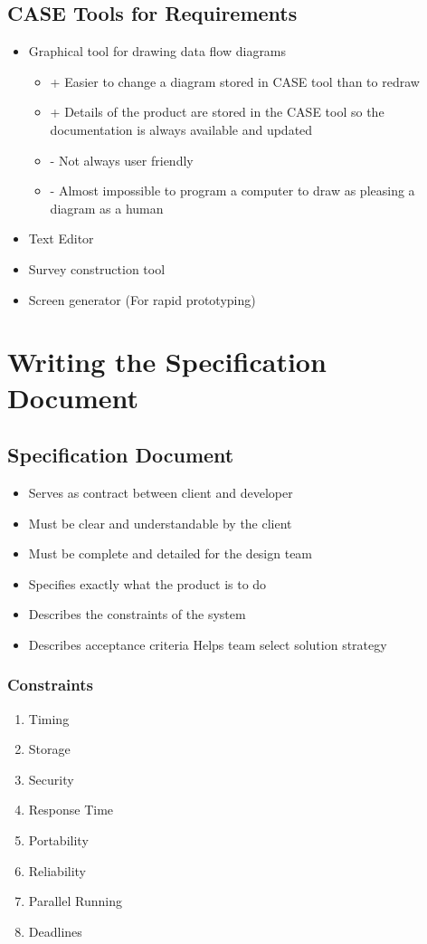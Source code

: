 \documentclass{report}
\begin{document}
		\section{CASE Tools for Requirements}
			\begin{itemize}
				\item Graphical tool for drawing data flow diagrams
					\begin{itemize}
						\item + Easier to change a diagram stored in CASE tool than to redraw
						\item + Details of the product are stored in the CASE tool so the documentation is always available and updated
						\item - Not always user friendly
						\item - Almost impossible to program a computer to draw as pleasing a diagram as a human
					\end{itemize}
				\item Text Editor
				\item Survey construction tool
				\item Screen generator (For rapid prototyping)
			\end{itemize}
	\chapter{Writing the Specification Document} %
		\section{Specification Document}
			\begin{itemize}
				\item Serves as contract between client and developer
				\item Must be clear and understandable by the client
				\item Must be complete and detailed for the design team
				\item Specifies exactly what the product is to do
				\item Describes the constraints of the system
				\item Describes acceptance criteria	Helps team select solution strategy
			\end{itemize}
			\subsection{Constraints} %
				\begin{enumerate}
					\item Timing
					\item Storage
					\item Security
					\item Response Time
					\item Portability
					\item Reliability
					\item Parallel Running
					\item Deadlines
				\end{enumerate}
\end{document}
